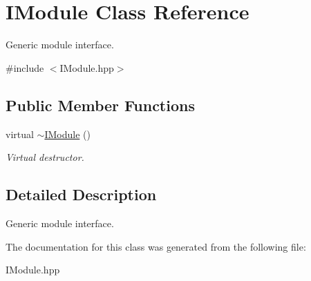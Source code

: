 \hypertarget{class_i_module}{}\section{I\+Module Class Reference}
\label{class_i_module}


Generic module interface.  




{\ttfamily \#include $<$I\+Module.\+hpp$>$}

\subsection*{Public Member Functions}
\begin{DoxyCompactItemize}
\item 
\hypertarget{class_i_module_a4594ddd506db5d8270d970d55875a8e9}{}virtual \hyperlink{class_i_module_a4594ddd506db5d8270d970d55875a8e9}{$\sim$\+I\+Module} ()\label{class_i_module_a4594ddd506db5d8270d970d55875a8e9}

\begin{DoxyCompactList}\small\item\em Virtual destructor. \end{DoxyCompactList}\end{DoxyCompactItemize}


\subsection{Detailed Description}
Generic module interface. 

The documentation for this class was generated from the following file\+:\begin{DoxyCompactItemize}
\item 
I\+Module.\+hpp\end{DoxyCompactItemize}
